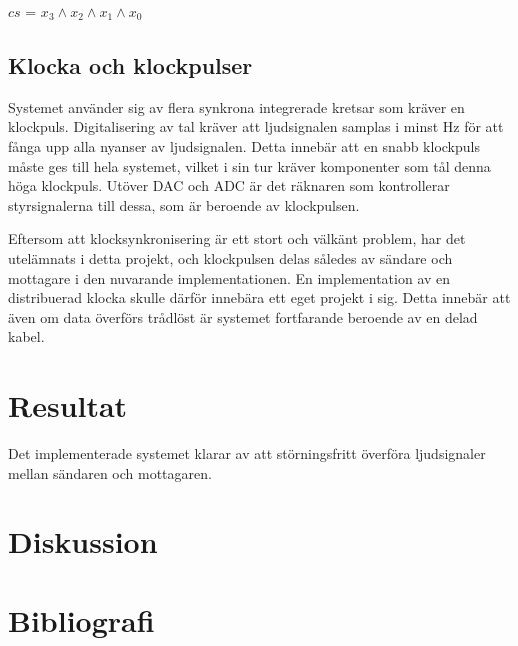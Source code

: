 \documentclass[a4paper,10pt]{article}
\begin{document}
$cs$ = $x_3 \wedge x_2 \wedge x_1 \wedge x_0$

\subsection{Klocka och klockpulser}

Systemet använder sig av flera synkrona integrerade kretsar som kräver en
klockpuls. Digitalisering av tal kräver att ljudsignalen samplas i minst 
 Hz för att fånga upp alla nyanser av ljudsignalen. Detta innebär att 
en snabb klockpuls måste ges till hela systemet, vilket i sin tur kräver 
komponenter som tål denna höga klockpuls. Utöver DAC och ADC är det räknaren som 
kontrollerar styrsignalerna till dessa, som är beroende av klockpulsen. 

Eftersom att klocksynkronisering är ett stort och välkänt problem, har det 
utelämnats i detta projekt, och klockpulsen delas således av sändare och 
mottagare i den nuvarande implementationen. En implementation av en distribuerad 
klocka skulle därför innebära ett eget projekt i sig. Detta innebär att även om 
data överförs trådlöst är systemet fortfarande beroende av en delad kabel. 


\section{Resultat}

Det implementerade systemet klarar av att störningsfritt överföra ljudsignaler
mellan sändaren och mottagaren. 

\section{Diskussion}

\section{Bibliografi}

\begin{thebibliography}{hejhej}

\end{thebibliography}
\end{document}

